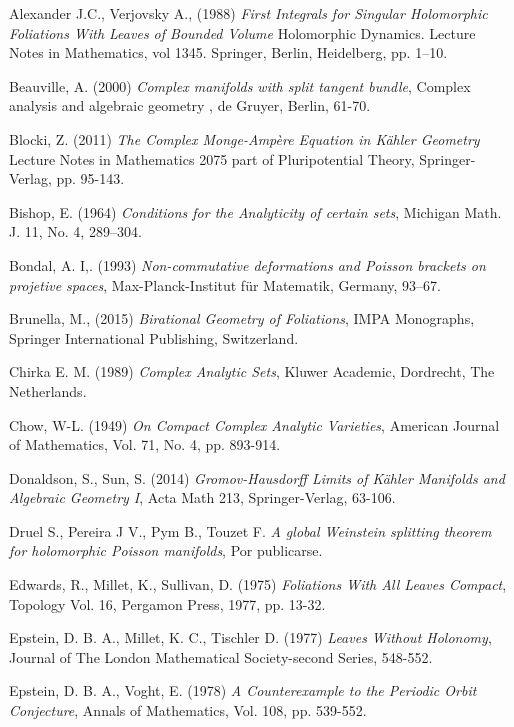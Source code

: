 \documentclass[12pt,twoside,a4paper]{report}
\begin{document}
\begin{thebibliography}
 Alexander J.C., Verjovsky A., (1988) \textit{First Integrals for Singular Holomorphic Foliations With Leaves of Bounded Volume}
Holomorphic Dynamics. Lecture Notes in Mathematics, vol 1345. Springer, Berlin, Heidelberg, pp. 1–10.

 Beauville, A. (2000) \textit{Complex manifolds with split tangent bundle}, Complex analysis and algebraic geometry
, de Gruyer, Berlin, 61-70.

 Blocki, Z. (2011) \textit{The Complex Monge-Amp\`ere Equation in K\"ahler Geometry} Lecture Notes in Mathematics 2075
part of Pluripotential Theory, Springer-Verlag, pp. 95-143.

 Bishop, E. (1964) \textit{Conditions for the Analyticity  of certain sets}, Michigan Math. J. 11, No. 4, 289--304.

 Bondal, A. I,. (1993) \textit{Non-commutative deformations and Poisson brackets on projetive spaces},
Max-Planck-Institut f\"ur Matematik, Germany, 93–67.

 Brunella, M., (2015) \textit{Birational Geometry of Foliations}, IMPA Monographs,
Springer International Publishing, Switzerland.

 Chirka E. M. (1989) \textit{Complex Analytic Sets}, Kluwer
Academic, Dordrecht, The Netherlands.

 Chow, W-L. (1949) \textit{On Compact Complex Analytic Varieties},
American Journal of Mathematics, Vol. 71, No. 4, pp. 893-914.

 Donaldson, S., Sun, S. (2014) \textit{Gromov-Hausdorff Limits of K\"ahler Manifolds and Algebraic Geometry I},
 Acta Math 213, Springer-Verlag, 63-106.

Druel S., Pereira J V., Pym B., Touzet F. \textit{A global Weinstein splitting theorem for
holomorphic Poisson manifolds}, Por publicarse.

 Edwards, R., Millet, K., Sullivan, D. (1975) \textit{Foliations
With All Leaves Compact}, Topology Vol. 16, Pergamon Press, 1977, pp. 13-32.

 Epstein, D. B. A., Millet, K. C., Tischler D.
(1977) \textit{Leaves Without Holonomy}, Journal of The London Mathematical Society-second Series, 548-552.

 Epstein, D. B. A., Voght, E. (1978) \textit{A Counterexample to the Periodic Orbit Conjecture},
Annals of Mathematics, Vol. 108, pp. 539-552.


\end{thebibliography}
\end{document}
